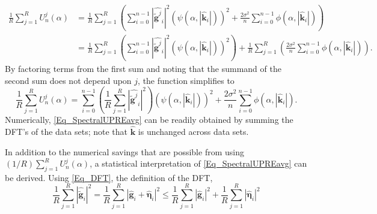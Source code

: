 \documentclass[12pt]{article}
\newcommand{\gdis}{\mathbf{g}}
\newcommand{\gnoise}{\widetilde{\mathbf{g}}}
\newcommand{\kdis}{\mathbf{k}}
\newcommand{\regparam}{\alpha}
\newcommand{\filt}{\phi}
\newcommand{\mfilt}{\psi}
\newcommand{\noiseSD}{\sigma}	%
\newcommand{\noise}{\bm{\eta}}	%
\newcommand{\U}{U}	%
\begin{document}
\begin{align*}
\frac{1}{R}\sum_{j=1}^R \U_n^j(\regparam) &= \frac{1}{R}\sum_{j=1}^R \left(\sum_{i = 0}^{n-1} |\widehat{\gnoise^j}_i|^2(\mfilt(\regparam,|\widehat{\kdis}_i|))^2 + \frac{2\noiseSD^2}{n}\sum_{i = 0}^{n-1} \filt(\regparam,|\widehat{\kdis}_i|)\right) \\
&= \frac{1}{R}\sum_{j=1}^R \left(\sum_{i = 0}^{n-1} |\widehat{\gnoise^j}_i|^2(\mfilt(\regparam,|\widehat{\kdis}_i|))^2\right) + \frac{1}{R}\sum_{j=1}^R \left(\frac{2\noiseSD^2}{n}\sum_{i = 0}^{n-1} \filt(\regparam,|\widehat{\kdis}_i|)\right).
\end{align*}
By factoring terms from the first sum and noting that the summand of the second sum does not depend upon $j$, the function simplifies to
\begin{equation}
\frac{1}{R}\sum_{j=1}^R \U_n^j(\regparam) =  \sum_{i = 0}^{n-1} \left(\frac{1}{R}\sum_{j=1}^R |\widehat{\gnoise^j}_i|^2\right)(\mfilt(\regparam,|\widehat{\kdis}_i|))^2 + \frac{2\noiseSD^2}{n}\sum_{i = 0}^{n-1} \filt(\regparam,|\widehat{\kdis}_i|).
\label{Eq_SpectralUPREavg}
\end{equation}
Numerically, \eqref{Eq_SpectralUPREavg} can be readily obtained by summing the DFT's of the data sets; note that $\widehat{\kdis}$ is unchanged across data sets. \par
In addition to the numerical savings that are possible from using $(1/R)\sum_{j=1}^R \U_n^j(\regparam)$, a statistical interpretation of \eqref{Eq_SpectralUPREavg} can be derived. Using \eqref{Eq_DFT}, the definition of the DFT,
\[\frac{1}{R}\sum_{j=1}^R |\widehat{\gnoise}_i|^2 = \frac{1}{R}\sum_{j=1}^R |\widehat{\gdis}_i + \widehat{\noise}_i|^2 \leq \frac{1}{R}\sum_{j=1}^R |\widehat{\gdis}_i|^2  + \frac{1}{R}\sum_{j=1}^R |\widehat{\noise}_i|^2 \] 
\end{document}
